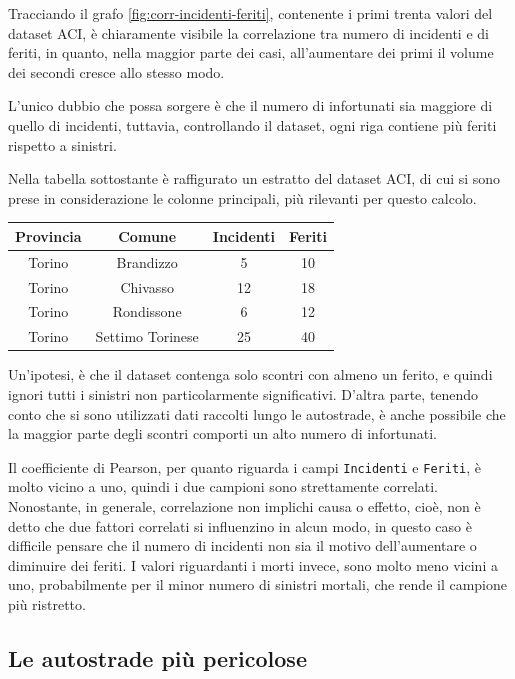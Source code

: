 \documentclass[a4paper,12pt]{report}
\newcommand{\columnstyle}[1]{\texttt{#1}}
\begin{document}
Tracciando il grafo \ref{fig:corr-incidenti-feriti}, contenente i primi trenta valori 
del dataset ACI, è chiaramente visibile la correlazione tra 
numero di incidenti e di feriti, in quanto, nella maggior parte dei casi, 
all'aumentare dei primi il volume dei secondi cresce allo stesso modo.

L'unico dubbio che possa sorgere è che il numero di infortunati sia maggiore di quello 
di incidenti, tuttavia, controllando il dataset, ogni 
riga contiene più feriti rispetto a sinistri.

Nella tabella sottostante è raffigurato un estratto del dataset ACI, 
di cui si sono prese in considerazione le colonne principali, più 
rilevanti per questo calcolo. 

\begin{center}
    \def\arraystretch{1.5}%
    \begin{tabular}{ |c|c|c|c| } 
    \hline
    Provincia & Comune & Incidenti & Feriti \\ 
    \hline
    \rowcolor{TableGray}
    Torino & Brandizzo & 5 & 10\\
    Torino & Chivasso & 12 & 18\\
    \rowcolor{TableGray}
    Torino & Rondissone & 6 & 12\\
    Torino & Settimo Torinese & 25 & 40\\
    \hline
    \end{tabular}
\end{center}

Un'ipotesi, è che il dataset contenga solo scontri con almeno un ferito, 
e quindi ignori tutti i sinistri non particolarmente significativi.
D'altra parte, tenendo conto che si sono utilizzati dati raccolti lungo 
le autostrade, è anche possibile che la maggior parte degli scontri comporti 
un alto numero di infortunati. 

Il coefficiente di Pearson, per quanto riguarda i campi \columnstyle{Incidenti} 
e \columnstyle{Feriti}, 
è molto vicino a uno, quindi i due campioni sono strettamente correlati.
Nonostante, in generale, correlazione non implichi causa o effetto, cioè, non 
è detto che due fattori correlati si influenzino in alcun modo, in questo caso è 
difficile pensare che il numero di incidenti non sia il motivo dell'aumentare o diminuire 
dei feriti.
I valori riguardanti i morti invece, sono molto meno vicini a uno, probabilmente 
per il minor numero di sinistri mortali, che rende il campione più ristretto.

\subsection{Le autostrade più pericolose}
\end{document}

